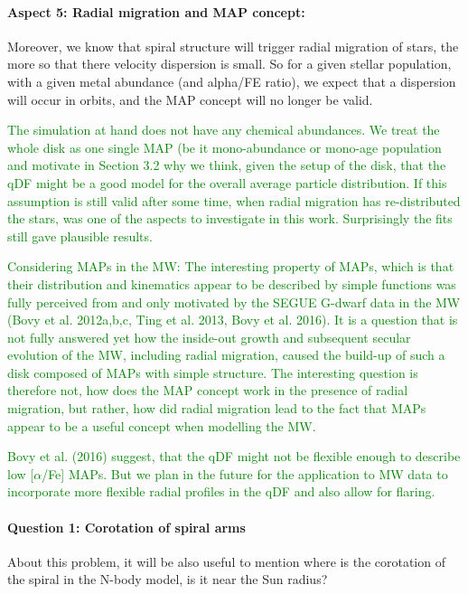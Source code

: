 \documentclass[10pt,a4paper]{article}
\newcommand{\Answer}[1]{\textcolor{Green}{#1}}
\begin{document}
\paragraph{Aspect 5: Radial migration and MAP concept:} Moreover, we know that spiral structure will trigger radial migration of stars, the
more so that there velocity dispersion is small. So for a given stellar population,
with a given metal abundance (and alpha/FE ratio), we expect that a dispersion will
occur in orbits, and the MAP concept will no longer be valid. 

\Answer{The simulation at hand does not have any chemical abundances. We treat the whole disk as one single MAP (be it mono-abundance or mono-age population and motivate in Section 3.2 why we think, given the setup of the disk, that the qDF might be a good model for the overall average particle distribution. If this assumption is still valid after some time, when radial migration has re-distributed the stars, was one of the aspects to investigate in this work. Surprisingly the fits still gave plausible results.}

\Answer{Considering MAPs in the MW: The interesting property of MAPs, which is that their distribution and kinematics appear to be described by simple functions was fully perceived from and only motivated by the SEGUE G-dwarf data in the MW (Bovy et al. 2012a,b,c, Ting et al. 2013, Bovy et al. 2016). It is a question that is not fully answered yet how the inside-out growth and subsequent secular evolution of the MW, including radial migration, caused the build-up of such a disk composed of MAPs with simple structure. The interesting question is therefore not, how does the MAP concept work in the presence of radial migration, but rather, how did radial migration lead to the fact that MAPs appear to be a useful concept when modelling the MW.}

\Answer{Bovy et al. (2016) suggest, that the qDF might not be flexible enough to describe low [$\alpha$/Fe] MAPs. But we plan in the future for the application to MW data to incorporate more flexible radial profiles in the qDF and also allow for flaring.}

\paragraph{Question 1: Corotation of spiral arms} About this problem, it will be also useful to mention where is the corotation of the
spiral in the N-body model, is it near the Sun radius?
\end{document}
